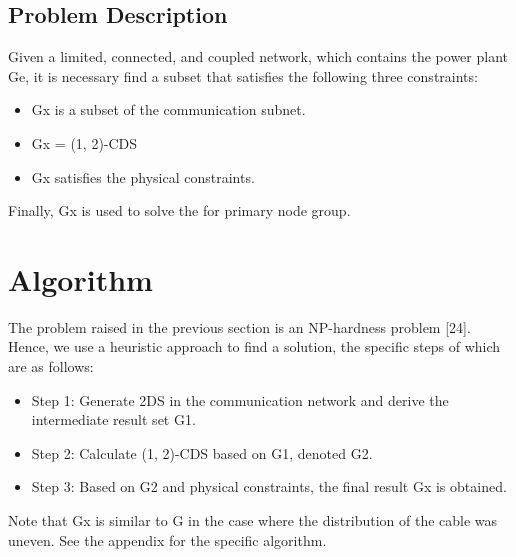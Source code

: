 \documentclass[AMA,STIX1COL]{WileyNJD-v2}
\begin{document}
\subsection{Problem Description}
Given a limited, connected, and coupled network, which contains the power plant Ge, it is necessary find a subset that satisfies the following three constraints:
\begin{itemize}
\item Gx is a subset of the communication subnet.
\item Gx = (1, 2)-CDS
\item Gx satisfies the physical constraints.
\end{itemize}
\par Finally, Gx is used to solve the for primary node group. 



\section{Algorithm}
The problem raised in the previous section is an NP-hardness problem [24]. Hence, we use a heuristic approach to find a solution, the specific steps of which are as follows:
\begin{itemize}
\item Step 1: Generate 2DS in the communication network and derive the intermediate result set G1.
\item Step 2: Calculate (1, 2)-CDS based on G1, denoted G2.
\item Step 3: Based on G2 and physical constraints, the final result Gx is obtained.
\end{itemize}
\par Note that Gx is similar to G in the case where the distribution of the cable was uneven. See the appendix for the specific algorithm.
\end{document}
